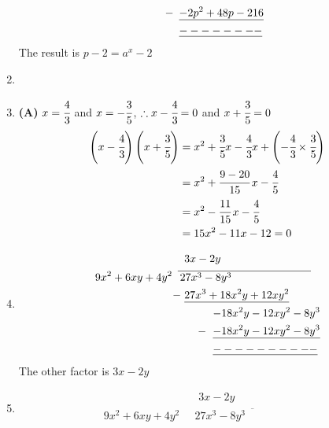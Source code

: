 \begin{multicols}{2}
\begin{enumerate}[label={\textbf{\arabic*.}}]
\begin{align*}
      -\hspace{-20pt} & \hspace{25pt} \underline{-2p^2 + 48p - 216} \\
      & \hspace{25pt} \underline{--------}
    \end{align*}
    The result is \( p - 2 = a^x - 2 \)
\item
\item \textbf{(A)} \( x = \cfrac{4}{3} \) and \( x = -\cfrac{3}{5} \), \hspace{5pt} \( \therefore  x-\cfrac{4}{3} = 0 \) and \( x+\cfrac{3}{5} = 0 \) 
    \begin{align*}
    \left(x-\cfrac{4}{3}\right)\left(x+\cfrac{3}{5}\right) &= x^2 + \cfrac{3}{5}x - \cfrac{4}{3}x + \left(-\cfrac{4}{3} \times \cfrac{3}{5}\right) \\
    &= x^2  +  \cfrac{9 - 20}{15}\,x -\cfrac{4}{5} \\
    &= x^2 - \cfrac{11}{15}\,x -\cfrac{4}{5} \\
    &= 15x^2 - 11x - 12 = 0
    \end{align*}
\item 
    \begin{align*}
    &\hspace{6pt} 3x - 2y \\
        9x^2 + 6xy + 4y^2 \hspace{5pt}  & \overline{\hspace{2pt} 27x^3 - 8y^3 \hspace{1in}} \\
      -\hspace{-3pt} & \hspace{6pt} \underline{27x^3 + 18x^2y + 12xy^2} \\
      & \hspace{32pt} {-18x^2y - 12xy^2 - 8y^3} \\
     -\hspace{-26pt} & \hspace{32pt} \underline{-18x^2y - 12xy^2 -8y^3}\\
     & \hspace{32pt} \underline{----------}
    \end{align*}
    The other factor is \(3x - 2y\)
\item 
    \begin{align*}
    &\hspace{6pt} 3x - 2y \\
        9x^2 + 6xy + 4y^2 \hspace{5pt}  & \overline{\hspace{2pt} 27x^3 - 8y^3 \hspace{1in}} \\

\end{align*}
\end{enumerate}
\end{multicols}

